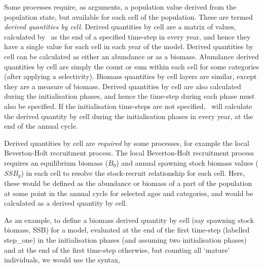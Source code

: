Some processes require, as arguments, a population value derived from the population state, but available for each cell of the population. These are termed \emph{derived quantities by cell}. Derived quantities by cell are a matrix of values, calculated by \SPM\ as the end of a specified time-step in every year, and hence they have a single value for each cell in each year of the model. Derived quantities by cell can be calculated as either an abundance or as a biomass. Abundance derived quantities by cell are simply the count or sum within each cell for some categories (after applying a selectivity). Biomass quantities by cell layers are similar, except they are a measure of biomass. Derived quantities by cell are also calculated during the initialisation phases, and hence the time-step during each phase must also be specified. If the initialisation time-steps are not specified, \SPM\ will calculate the derived quantity by cell during the initialisation phases in every year, at the end of the annual cycle.

Derived quantities by cell are \emph{required} by some processes, for example the local Beverton-Holt recruitment process. The local Beverton-Holt recruitment process requires an equilibrium biomass ($B_0$) and annual spawning stock biomass values ($SSB_y$) in each cell to resolve the stock-recruit relationship for each cell. Here, these would be defined as the abundance or biomass of a part of the population at some point in the annual cycle for selected ages and categories, and would be calculated as a derived quantity by cell.

As an example, to define a biomass derived quantity by cell (say spawning stock biomass, SSB) for a model, evaluated at the end of the first time-step (labelled step\_one) in the initialisation phases (and assuming two initialisation phases) and at the end of the first time-step otherwise, but counting all `mature' individuals, we would use the syntax,

